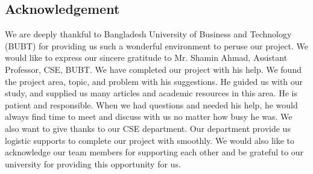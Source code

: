 \begin{center}
    \section*{Acknowledgement}
\end{center}
\large We are deeply thankful to Bangladesh University of Business and Technology (BUBT) for providing us such a wonderful environment to peruse our project. We would like to express our sincere gratitude to Mr. Shamin Ahmad, Assistant Professor, CSE, BUBT. We have completed our project
with his help. We found the project area, topic, and problem with his suggestions. He guided us with our study, and supplied us many articles and academic resources in this area. He is patient and responsible. When we had questions and needed his help, he would always find time to meet and discuss with us no matter how busy he was. We also want to give thanks to our CSE department. Our department provide us logistic supports to complete our project with smoothly. We would also like to acknowledge our team members for supporting each other and be grateful to our university for providing  this opportunity for us. 
